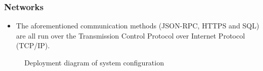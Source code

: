 \documentclass{article}
\begin{document}
\subsubsection*{Networks}
\begin{itemize}
\item The aforementioned communication methods (JSON-RPC, HTTPS and SQL) are all run over the Transmission Control Protocol over Internet Protocol (TCP/IP).
\end{itemize}


\begin{figure}[h]
\centering
{}
\caption{Deployment diagram of system configuration}
\end{figure}
\end{document}
